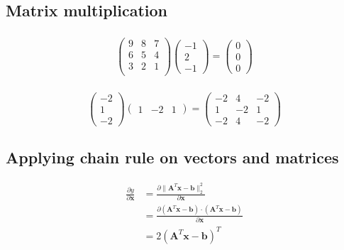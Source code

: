 \documentclass[11pt]{article}
\begin{document}
\subsection{Matrix multiplication} %
\subsubsection{} %
\[
\begin{pmatrix}
	9 & 8 & 7\\
	6 & 5 & 4\\
	3 & 2 & 1\\
\end{pmatrix}
\begin{pmatrix}
	-1\\
	2\\
	-1
\end{pmatrix}=
\begin{pmatrix}
	0\\
	0\\
	0
\end{pmatrix}
\]


\subsubsection{} %
\[
\begin{pmatrix}
	-2\\
	1\\
	-2
\end{pmatrix}
\begin{pmatrix}
	1 & -2 & 1
\end{pmatrix}=
\begin{pmatrix}
	-2 & 4 & -2\\
	1 & -2 & 1\\
	-2 & 4 & -2
\end{pmatrix}
\]


\subsection{Applying chain rule on vectors and matrices} %
\begin{align*}
	\frac{\partial y}{\partial\mathbf x}
	&=\frac{\partial \lVert\mathbf A^T\mathbf x-\mathbf b\rVert_2^2}{\partial\mathbf x}\\
	&=\frac{\partial (\mathbf A^T\mathbf x-\mathbf b)\cdot(\mathbf A^T\mathbf x-\mathbf b)}{\partial\mathbf x}\\
	&=2(\mathbf A^T\mathbf x-\mathbf b)^T%
\end{align*}
\end{document}
